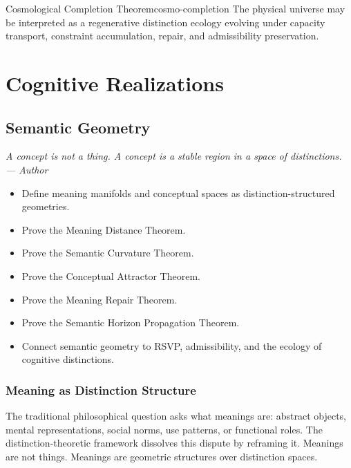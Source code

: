 \documentclass[12pt,twoside,openright]{book}
\newenvironment{epigraph}[2]{%
  \vspace{1em}\begin{flushright}
  \begin{minipage}{0.72\textwidth}
  \itshape\small #1\\[0.4em]
  \upshape\footnotesize\sffamily\color{DistGray}--- #2
  \end{minipage}\end{flushright}\vspace{1.5em}}{}
\newenvironment{objectives}{%
  \begin{tcolorbox}[colback=DistBlue!5,colframe=DistBlue,
    title={\faCheckCircle\enspace Learning Objectives},
    fonttitle=\sffamily\bfseries\color{white},
    attach boxed title to top left={yshift=-2mm,xshift=4mm},
    boxed title style={colback=DistBlue},breakable]
  \begin{itemize}[leftmargin=*,nosep]}{%
  \end{itemize}\end{tcolorbox}\vspace{1em}}
\begin{document}
\begin{theorem}{Cosmological Completion Theorem}{cosmo-completion}
  The physical universe may be interpreted as a regenerative
  distinction ecology evolving under capacity transport,
  constraint accumulation, repair, and admissibility
  preservation.
\end{theorem}

\part{Cognitive Realizations}

\chapter{Semantic Geometry}
\label{ch:semantic-geometry}

\begin{epigraph}{%
  A concept is not a thing.
  A concept is a stable region in a space of distinctions.}%
  {Author}
\end{epigraph}

\begin{objectives}
  \item Define meaning manifolds and conceptual spaces
        as distinction-structured geometries.
  \item Prove the Meaning Distance Theorem.
  \item Prove the Semantic Curvature Theorem.
  \item Prove the Conceptual Attractor Theorem.
  \item Prove the Meaning Repair Theorem.
  \item Prove the Semantic Horizon Propagation Theorem.
  \item Connect semantic geometry to RSVP, admissibility,
        and the ecology of cognitive distinctions.
\end{objectives}

\section{Meaning as Distinction Structure}

The traditional philosophical question asks what meanings
are: abstract objects, mental representations, social
norms, use patterns, or functional roles.
The distinction-theoretic framework dissolves this
dispute by reframing it.
Meanings are not things. Meanings are geometric
structures over distinction spaces.
\end{document}
